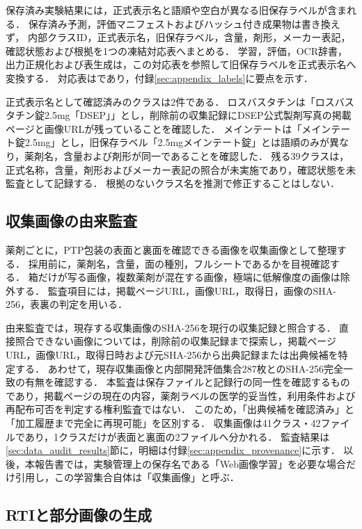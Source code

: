 \documentclass[uplatex,dvipdfmx]{jsarticle}
\begin{document}
保存済み実験結果には，正式表示名と語順や空白が異なる旧保存ラベルが含まれる．
保存済み予測，評価マニフェストおよびハッシュ付き成果物は書き換えず，
内部クラスID，正式表示名，旧保存ラベル，含量，剤形，メーカー表記，確認状態および根拠を1つの凍結対応表へまとめる．
学習，評価，OCR辞書，出力正規化および表生成は，この対応表を参照して旧保存ラベルを正式表示名へ変換する．
対応表はであり，付録\ref{sec:appendix_labels}に要点を示す．

正式表示名として確認済みのクラスは2件である．
ロスバスタチンは「ロスバスタチン錠2.5mg「DSEP」」とし，削除前の収集記録にDSEP公式製剤写真の掲載ページと画像URLが残っていることを確認した．
メインテートは「メインテート錠2.5mg」とし，旧保存ラベル「2.5mgメインテート錠」とは語順のみが異なり，薬剤名，含量および剤形が同一であることを確認した．
残る39クラスは，正式名称，含量，剤形およびメーカー表記の照合が未実施であり，確認状態を未監査として記録する．
根拠のないクラス名を推測で修正することはしない．

\subsection{収集画像の由来監査}\label{sec:provenance_audit}

薬剤ごとに，PTP包装の表面と裏面を確認できる画像を収集画像として整理する．
採用前に，薬剤名，含量，面の種別，フルシートであるかを目視確認する．
箱だけが写る画像，複数薬剤が混在する画像，極端に低解像度の画像は除外する．
監査項目には，掲載ページURL，画像URL，取得日，画像のSHA-256，表裏の判定を用いる．

由来監査では，現存する収集画像のSHA-256を現行の収集記録と照合する．
直接照合できない画像については，削除前の収集記録まで探索し，掲載ページURL，画像URL，取得日時および元SHA-256から出典記録または出典候補を特定する．
あわせて，現存収集画像と内部開発評価集合287枚とのSHA-256完全一致の有無を確認する．
本監査は保存ファイルと記録行の同一性を確認するものであり，掲載ページの現在の内容，薬剤ラベルの医学的妥当性，利用条件および再配布可否を判定する権利監査ではない．
このため，「出典候補を確認済み」と「加工履歴まで完全に再現可能」を区別する．
収集画像は41クラス・42ファイルであり，1クラスだけが表面と裏面の2ファイルへ分かれる．
監査結果は\ref{sec:data_audit_results}節に，明細は付録\ref{sec:appendix_provenance}に示す．
以後，本報告書では，実験管理上の保存名である「Web画像学習」を必要な場合だけ引用し，この学習集合自体は「収集画像」と呼ぶ．

\subsection{RTIと部分画像の生成}
\end{document}
